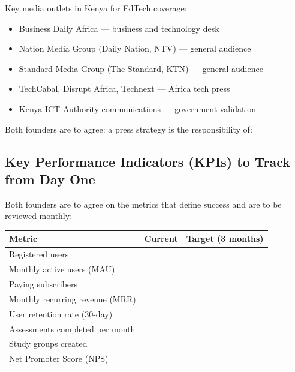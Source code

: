 \documentclass[12pt,a4paper]{article}
\newcommand{\blank}[1][5.5cm]{\underline{\hspace{#1}}}
\begin{document}
Key media outlets in Kenya for EdTech coverage:

\begin{itemize}
  \item Business Daily Africa --- business and technology desk
  \item Nation Media Group (Daily Nation, NTV) --- general audience
  \item Standard Media Group (The Standard, KTN) --- general audience
  \item TechCabal, Disrupt Africa, Technext --- Africa tech press
  \item Kenya ICT Authority communications --- government validation
\end{itemize}

\noindent Both founders are to agree: a press strategy is the responsibility of: \blank[5cm]

\subsection{Key Performance Indicators (KPIs) to Track from Day One}

Both founders are to agree on the metrics that define success and are to be reviewed monthly:

\begin{tabularx}{\linewidth}{L{5cm} C{3cm} C{3cm}}
  \toprule
  \textbf{Metric} & \textbf{Current} & \textbf{Target (3 months)} \\
  \midrule
  Registered users               & \blank[2.5cm] & \blank[2.5cm] \\[0.4em]
  Monthly active users (MAU)     & \blank[2.5cm] & \blank[2.5cm] \\[0.4em]
  Paying subscribers             & \blank[2.5cm] & \blank[2.5cm] \\[0.4em]
  Monthly recurring revenue (MRR) & \blank[2.5cm] & \blank[2.5cm] \\[0.4em]
  User retention rate (30-day)   & \blank[2.5cm] & \blank[2.5cm] \\[0.4em]
  Assessments completed per month & \blank[2.5cm] & \blank[2.5cm] \\[0.4em]
  Study groups created           & \blank[2.5cm] & \blank[2.5cm] \\[0.4em]
  Net Promoter Score (NPS)       & \blank[2.5cm] & \blank[2.5cm] \\
  \bottomrule
\end{tabularx}

\end{document}
